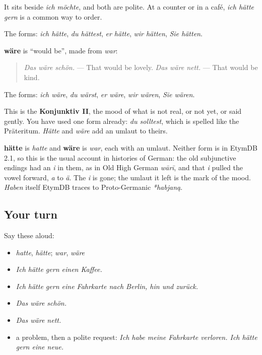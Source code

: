 It sits beside \emph{ich möchte}, and both are polite. At a counter or in a café, \emph{ich hätte gern} is a common way to order.

The forms: \emph{ich hätte}, \emph{du hättest}, \emph{er hätte}, \emph{wir hätten}, \emph{Sie hätten}.

\begin{grammarlens}[title={Grammar Lens: das wäre}]
\textbf{wäre} is \textquotedblleft{}would be\textquotedblright{}, made from \emph{war}:

\begin{quote}
\emph{Das wäre schön.} — That would be lovely. \emph{Das wäre nett.} — That would be kind.
\end{quote}

The forms: \emph{ich wäre}, \emph{du wärst}, \emph{er wäre}, \emph{wir wären}, \emph{Sie wären}.

This is the \textbf{Konjunktiv II}, the mood of what is not real, or not yet, or said gently. You have used one form already: \emph{du solltest}, which is spelled like the Präteritum. \emph{Hätte} and \emph{wäre} add an umlaut to theirs.
\end{grammarlens}

\begin{cousinweb}
\textbf{hätte} is \emph{hatte} and \textbf{wäre} is \emph{war}, each with an umlaut. Neither form is in EtymDB 2.1, so this is the usual account in histories of German: the old subjunctive endings had an \emph{i} in them, as in Old High German \emph{wārī}, and that \emph{i} pulled the vowel forward, \emph{a} to \emph{ä}. The \emph{i} is gone; the umlaut it left is the mark of the mood. \emph{Haben} itself EtymDB traces to Proto-Germanic \emph{*habjaną}.
\end{cousinweb}

\subsection*{Your turn}
Say these aloud:

\begin{itemize}
\raggedright
  \item \emph{hatte}, \emph{hätte}; \emph{war}, \emph{wäre}
  \item \emph{Ich hätte gern einen Kaffee.}
  \item \emph{Ich hätte gern eine Fahrkarte nach Berlin, hin und zurück.}
  \item \emph{Das wäre schön.}
  \item \emph{Das wäre nett.}
  \item a problem, then a polite request: \emph{Ich habe meine Fahrkarte verloren. Ich hätte gern eine neue.}
\end{itemize}

